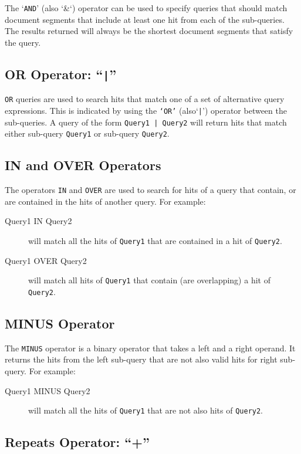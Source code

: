 The `{\tt AND}' (also `\&`) operator can be used to specify queries that should
match document segments that include at least one hit from each of the
sub-queries. The results returned will always be the shortest document segments
that satisfy the query.

\subsection{OR Operator: ``{\tt |}''}\label{sec:or-query}

{\tt OR} queries are used to search hits that match one of a set of alternative
query expressions. This is indicated by using the {\tt `OR'} (also`\verb!|!')
operator between the sub-queries. A query of the form {\tt Query1 | Query2} will
return hits that match either sub-query {\tt Query1} or sub-query {\tt Query2}.

\subsection{IN and OVER Operators}\label{sec:containment-query}

The operators {\tt IN} and {\tt OVER} are used to search for hits of a query
that contain, or are contained in the hits of another query. For example:
\begin{description}
\item[Query1 IN Query2] will match all the hits of {\tt Query1} that are
contained in a hit of {\tt Query2}.
\item[Query1 OVER Query2] will match all hits of {\tt Query1} that contain (are
overlapping) a hit of {\tt Query2}.
\end{description}

\subsection{MINUS Operator}\label{sec:minus-query}

The {\tt MINUS} operator is a binary operator that takes a left and
a right operand. It returns the hits from the left sub-query that are not also
valid hits for right sub-query. For example:
\begin{description}
\item[Query1 MINUS Query2] will match all the hits of {\tt Query1} that are
not also hits of {\tt Query2}.
\end{description}

\subsection{Repeats Operator: ``+''}\label{sec:kleene-query}

